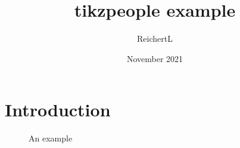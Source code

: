 \documentclass{article}
\title{tikzpeople example}
\author{ReichertL }
\date{November 2021}
\begin{document}
\maketitle

\section{Introduction}

\begin{figure}[h]
    \centering
   \resizebox{0.8\linewidth}{!}{}
    \caption{An example}
    \label{fig:postboxes}
\end{figure}
\end{document}
